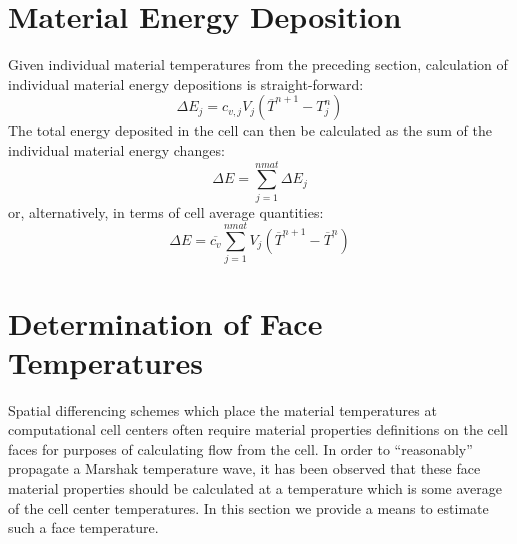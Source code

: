 \documentclass[12pt]{article}
\begin{document}
\section{Material Energy Deposition}
Given individual material temperatures from the preceding section,
calculation of individual material energy depositions is straight-forward:
\begin{equation}
\Delta E_{j} = c_{v,j} V_{j} (\overline{T}^{n+1}-T_{j}^{n})
\end{equation}
The total energy deposited in the cell can then be calculated as
the sum of the individual material energy changes:
\begin{equation}
\Delta E = \sum_{j=1}^{nmat} \Delta E_{j}
\end{equation}
or, alternatively, in terms of cell average quantities:
\begin{equation}
\Delta E = \overline{c_v}\sum_{j=1}^{nmat} V_{j}
(\overline{T}^{n+1} - \overline{T}^{n})
\end{equation}

\section{Determination of Face Temperatures}

Spatial differencing schemes which place the material temperatures at
computational cell centers often require material properties definitions
on the cell faces for purposes of calculating flow from the cell. 
In order to ``reasonably'' propagate a Marshak temperature wave,  it has been observed
that these face material properties should be calculated at a temperature
which is  some average of the cell center temperatures. In this section
we provide a means to estimate such a face temperature.
\end{document}
